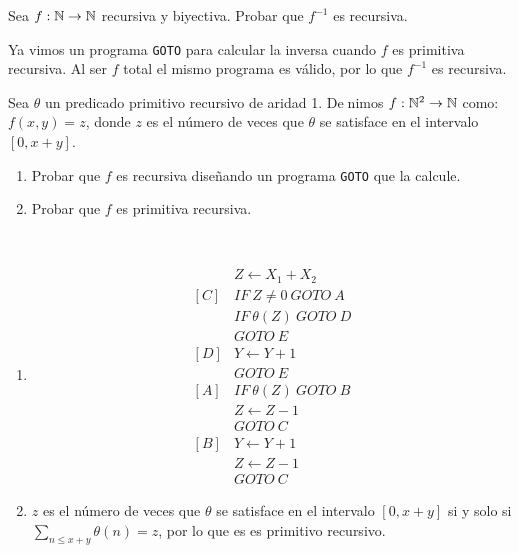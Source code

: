 \documentclass[twoside]{article}
\begin{document}
\newpage

\begin{ejercicio}{28}
Sea $f : \mathbb{N} \to \mathbb{N}$ recursiva y biyectiva. Probar que $f^{-1}$ es recursiva.
\end{ejercicio}
\begin{solucion}
Ya vimos un programa \texttt{GOTO} para calcular la inversa cuando $f$ es primitiva recursiva. Al ser $f$ total el mismo programa es válido, por lo que $f^{-1}$ es recursiva. 
\end{solucion}

\newpage

\begin{ejercicio}{29}
Sea $\theta$ un predicado primitivo recursivo de aridad 1. Denimos $f : \mathbb{N}^2 \to \mathbb{N}$ como:
$f(x, y) = z$, donde $z$ es el número de veces que $\theta$ se satisface en el intervalo $[0, x + y]$.
\begin{enumerate}
\item Probar que $f$ es recursiva diseñando un programa \texttt{GOTO} que la calcule.
\item Probar que $f$ es primitiva recursiva.
\end{enumerate}
\end{ejercicio}
\begin{solucion}\
\begin{enumerate}
\item 
\begin{align*}
& Z\leftarrow X_1+X_2\\
[C]& IF\ Z\neq 0\ GOTO\ A\\
&IF\ \theta(Z)\ GOTO\ D\\
& GOTO\ E\\
[D] & Y\leftarrow Y+1\\
& GOTO\ E\\
[A] & IF\ \theta(Z)\ GOTO\ B\\
& Z\leftarrow Z-1\\
& GOTO\ C\\
[B]& Y\leftarrow Y+1\\
& Z\leftarrow Z-1\\
& GOTO\ C
\end{align*}
\item $z$ es el número de veces que $\theta$ se satisface en el intervalo $[0, x + y]$ si y solo si $\sum_{n\leq x+y}\theta(n)=z$, por lo que es es primitivo recursivo. 
\end{enumerate}
\end{solucion}

\newpage
\end{document}
